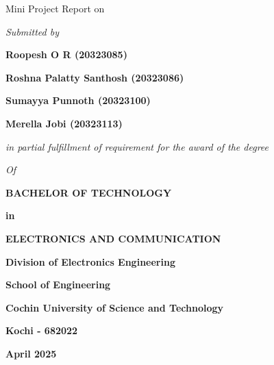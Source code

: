 \documentclass[12pt, a4paper]{report}
\newcommand{\subtitlefont}{\fontsize{18}{18}\selectfont}
\newcommand{\titlefont}{\fontsize{25}{25}\selectfont}
\newcommand{\titlepagefont}{\fontsize{13}{13}\selectfont}
\newcommand{\addsvg}[2]{}
\begin{document}
\linespread{1.2}
\setmainfont{Times New Roman}
\begin{titlepage}
  \titlepagefont
  \centering
  {\subtitlefont Mini Project Report on \par}
  \vspace{.3cm}

  {\titlefont {Automatic Irrigation System} \par}

  \vspace{1cm}

  {\textit{Submitted by} \par}
  \vspace{.5cm}

  \textbf {Roopesh O R (20323085)} \par
  \textbf {Roshna Palatty Santhosh (20323086)} \par
  \textbf {Sumayya Punnoth (20323100)} \par
  \textbf {Merella Jobi (20323113)} \par

  \vspace{1cm}
  {\textit{in partial fulfillment of requirement for the award of the
  degree} \par}
  {\textit{Of}} \par
  \vspace{.6cm}
  {\textbf{BACHELOR OF TECHNOLOGY} \par}
  {\textbf{in}} \par
  {\textbf{ELECTRONICS AND COMMUNICATION} \par}
  \vspace{1cm}

  \addsvg{cusat}{1.5in}\par

  \vspace{1cm}

  {\textbf{Division of Electronics Engineering} \par}
  {\textbf{School of Engineering} \par}
  {\textbf{Cochin University of Science and Technology} \par}
  {\textbf{Kochi - 682022} \par}

  \vspace{.5cm}

  {\textbf{April 2025} \par}

  \vfill

\end{titlepage}
\end{document}
